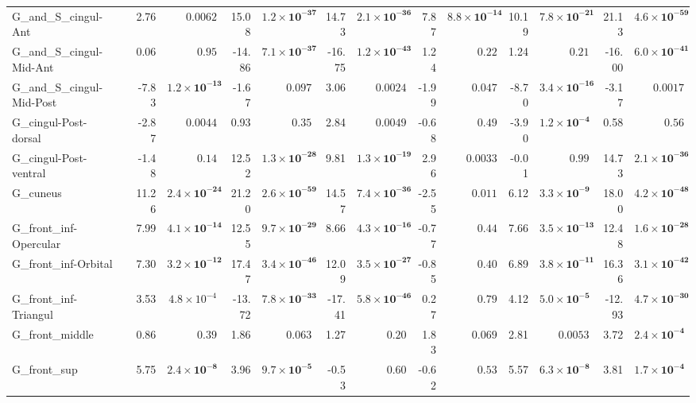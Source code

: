 {\begin{longtable}{llrrrrrrrrrrrr}
G\_and\_S\_cingul-Ant &  & 2.76 & $0.0062$ & 15.08 & $\mathbf{1.2{\times}10^{-37}}$ & 14.73 & $\mathbf{2.1{\times}10^{-36}}$ & 7.87 & $\mathbf{8.8{\times}10^{-14}}$ & 10.19 & $\mathbf{7.8{\times}10^{-21}}$ & 21.13 & $\mathbf{4.6{\times}10^{-59}}$ \\
G\_and\_S\_cingul-Mid-Ant &  & 0.06 & $0.95$ & -14.86 & $\mathbf{7.1{\times}10^{-37}}$ & -16.75 & $\mathbf{1.2{\times}10^{-43}}$ & 1.24 & $0.22$ & 1.24 & $0.21$ & -16.00 & $\mathbf{6.0{\times}10^{-41}}$ \\
G\_and\_S\_cingul-Mid-Post &  & -7.83 & $\mathbf{1.2{\times}10^{-13}}$ & -1.67 & $0.097$ & 3.06 & $0.0024$ & -1.99 & $0.047$ & -8.70 & $\mathbf{3.4{\times}10^{-16}}$ & -3.17 & $0.0017$ \\
G\_cingul-Post-dorsal &  & -2.87 & $0.0044$ & 0.93 & $0.35$ & 2.84 & $0.0049$ & -0.68 & $0.49$ & -3.90 & $\mathbf{1.2{\times}10^{-4}}$ & 0.58 & $0.56$ \\
G\_cingul-Post-ventral &  & -1.48 & $0.14$ & 12.52 & $\mathbf{1.3{\times}10^{-28}}$ & 9.81 & $\mathbf{1.3{\times}10^{-19}}$ & 2.96 & $0.0033$ & -0.01 & $0.99$ & 14.73 & $\mathbf{2.1{\times}10^{-36}}$ \\
G\_cuneus &  & 11.26 & $\mathbf{2.4{\times}10^{-24}}$ & 21.20 & $\mathbf{2.6{\times}10^{-59}}$ & 14.57 & $\mathbf{7.4{\times}10^{-36}}$ & -2.55 & $0.011$ & 6.12 & $\mathbf{3.3{\times}10^{-9}}$ & 18.00 & $\mathbf{4.2{\times}10^{-48}}$ \\
G\_front\_inf-Opercular &  & 7.99 & $\mathbf{4.1{\times}10^{-14}}$ & 12.55 & $\mathbf{9.7{\times}10^{-29}}$ & 8.66 & $\mathbf{4.3{\times}10^{-16}}$ & -0.77 & $0.44$ & 7.66 & $\mathbf{3.5{\times}10^{-13}}$ & 12.48 & $\mathbf{1.6{\times}10^{-28}}$ \\
G\_front\_inf-Orbital &  & 7.30 & $\mathbf{3.2{\times}10^{-12}}$ & 17.47 & $\mathbf{3.4{\times}10^{-46}}$ & 12.09 & $\mathbf{3.5{\times}10^{-27}}$ & -0.85 & $0.40$ & 6.89 & $\mathbf{3.8{\times}10^{-11}}$ & 16.36 & $\mathbf{3.1{\times}10^{-42}}$ \\
G\_front\_inf-Triangul &  & 3.53 & $4.8{\times}10^{-4}$ & -13.72 & $\mathbf{7.8{\times}10^{-33}}$ & -17.41 & $\mathbf{5.8{\times}10^{-46}}$ & 0.27 & $0.79$ & 4.12 & $\mathbf{5.0{\times}10^{-5}}$ & -12.93 & $\mathbf{4.7{\times}10^{-30}}$ \\
G\_front\_middle &  & 0.86 & $0.39$ & 1.86 & $0.063$ & 1.27 & $0.20$ & 1.83 & $0.069$ & 2.81 & $0.0053$ & 3.72 & $\mathbf{2.4{\times}10^{-4}}$ \\
G\_front\_sup &  & 5.75 & $\mathbf{2.4{\times}10^{-8}}$ & 3.96 & $\mathbf{9.7{\times}10^{-5}}$ & -0.53 & $0.60$ & -0.62 & $0.53$ & 5.57 & $\mathbf{6.3{\times}10^{-8}}$ & 3.81 & $\mathbf{1.7{\times}10^{-4}}$ \\

\end{longtable}}
